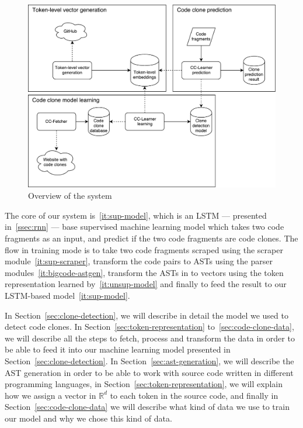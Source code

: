 \begin{figure}
  \centering\includegraphics[width=13cm]{./images/system-overview.pdf}
  \caption{\label{fig:system-overview}Overview of the system}
\end{figure}

The core of our system is~\ref{it:sup-model}, which is an LSTM --- presented
in~\ref{ssec:rnn} --- base supervised machine learning model which takes two
code fragments as an input, and predict if the two code fragments are code
clones. The flow in training mode is to take two code fragments scraped
using the scraper module~\ref{it:sup-scraper}, transform the code pairs to ASTs
using the parser modules~\ref{it:bigcode-astgen}, transform the ASTs in to
vectors using the token representation learned by~\ref{it:unsup-model} and
finally to feed the result to our LSTM-based model~\ref{it:sup-model}.

In Section~\ref{sec:clone-detection}, we will describe in detail the model we
used to detect code clones. In Section~\ref{sec:token-representation}
to~\ref{sec:code-clone-data}, we will describe all the steps to fetch, process
and transform the data in order to be able to feed it into our machine learning
model presented in Section~\ref{sec:clone-detection}.
In Section~\ref{sec:ast-generation}, we will describe the AST generation in
order to be able to work with source code written in different programming
languages, in Section~\ref{sec:token-representation}, we will explain how we
assign a vector in $\mathbb{R}^d$ to each token in the source code, and finally
in Section~\ref{sec:code-clone-data} we will describe what kind of data we use
to train our model and why we chose this kind of data.
%
